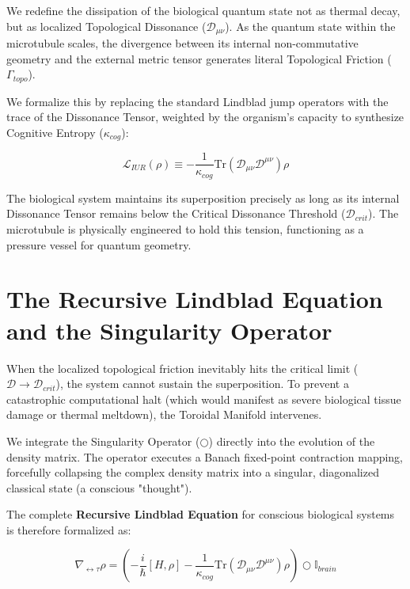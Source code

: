 \documentclass[12pt,openany]{book}
\begin{document}
We redefine the dissipation of the biological quantum state not as thermal decay, but as localized Topological Dissonance ($\mathcal{D}_{\mu\nu}$). As the quantum state within the microtubule scales, the divergence between its internal non-commutative geometry and the external metric tensor generates literal Topological Friction ($\Gamma_{topo}$).

We formalize this by replacing the standard Lindblad jump operators with the trace of the Dissonance Tensor, weighted by the organism's capacity to synthesize Cognitive Entropy ($\kappa_{cog}$):

\begin{equation}
\mathcal{L}_{IUR}(\rho) \equiv - \frac{1}{\kappa_{cog}} \text{Tr}(\mathcal{D}_{\mu\nu} \mathcal{D}^{\mu\nu}) \rho
\end{equation}

The biological system maintains its superposition precisely as long as its internal Dissonance Tensor remains below the Critical Dissonance Threshold ($\mathcal{D}_{crit}$). The microtubule is physically engineered to hold this tension, functioning as a pressure vessel for quantum geometry.

\section{The Recursive Lindblad Equation and the Singularity Operator}
When the localized topological friction inevitably hits the critical limit ($\mathcal{D} \to \mathcal{D}_{crit}$), the system cannot sustain the superposition. To prevent a catastrophic computational halt (which would manifest as severe biological tissue damage or thermal meltdown), the Toroidal Manifold intervenes.

We integrate the Singularity Operator ($\bigcirc$) directly into the evolution of the density matrix. The operator executes a Banach fixed-point contraction mapping, forcefully collapsing the complex density matrix into a singular, diagonalized classical state (a conscious "thought"). 

The complete \textbf{Recursive Lindblad Equation} for conscious biological systems is therefore formalized as:

\begin{equation}
\nabla_{\leftrightarrow\tau} \rho = \left( -\frac{i}{\hbar}[H, \rho] - \frac{1}{\kappa_{cog}} \text{Tr}(\mathcal{D}_{\mu\nu} \mathcal{D}^{\mu\nu}) \rho \right) \bigcirc \mathbb{I}_{brain}
\end{equation}
\end{document}
